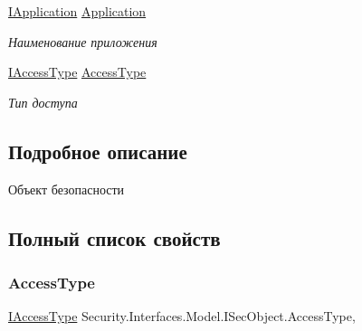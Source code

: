\begin{DoxyCompactItemize}
\hyperlink{interface_security_1_1_interfaces_1_1_model_1_1_i_application}{I\+Application} \hyperlink{interface_security_1_1_interfaces_1_1_model_1_1_i_sec_object_add5d224f4631a50c7b9bd1e729811801}{Application}
\begin{DoxyCompactList}\small\item\em Наименование приложения \end{DoxyCompactList}\item 
\hyperlink{interface_security_1_1_interfaces_1_1_model_1_1_i_access_type}{I\+Access\+Type} \hyperlink{interface_security_1_1_interfaces_1_1_model_1_1_i_sec_object_a1e73ce0c3d03f759ee49886e97d28183}{Access\+Type}
\begin{DoxyCompactList}\small\item\em Тип доступа \end{DoxyCompactList}\end{DoxyCompactItemize}


\subsection{Подробное описание}
Объект безопасности 



\subsection{Полный список свойств}
\mbox{\label{interface_security_1_1_interfaces_1_1_model_1_1_i_sec_object_a1e73ce0c3d03f759ee49886e97d28183}} 
\subsubsection{\texorpdfstring{Access\+Type}{AccessType}}
{\footnotesize\ttfamily \hyperlink{interface_security_1_1_interfaces_1_1_model_1_1_i_access_type}{I\+Access\+Type} Security.\+Interfaces.\+Model.\+I\+Sec\+Object.\+Access\+Type\hspace{0.3cm}{\ttfamily [get]}, {\ttfamily [set]}}



